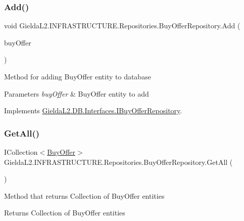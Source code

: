 \subsubsection{\texorpdfstring{Add()}{Add()}}
{\footnotesize\ttfamily void Gielda\+L2.\+I\+N\+F\+R\+A\+S\+T\+R\+U\+C\+T\+U\+R\+E.\+Repositories.\+Buy\+Offer\+Repository.\+Add (\begin{DoxyParamCaption}\item[{\mbox{\hyperlink{class_gielda_l2_1_1_d_b_1_1_entities_1_1_buy_offer}{Buy\+Offer}}}]{buy\+Offer }\end{DoxyParamCaption})}



Method for adding Buy\+Offer entity to database 


\begin{DoxyParams}{Parameters}
{\em buy\+Offer} & Buy\+Offer entity to add\\
\hline
\end{DoxyParams}


Implements \mbox{\hyperlink{interface_gielda_l2_1_1_d_b_1_1_interfaces_1_1_i_buy_offer_repository_aae66f2818cb5476f701c68266e413d87}{Gielda\+L2.\+D\+B.\+Interfaces.\+I\+Buy\+Offer\+Repository}}.

\mbox{\label{class_gielda_l2_1_1_i_n_f_r_a_s_t_r_u_c_t_u_r_e_1_1_repositories_1_1_buy_offer_repository_ab0ce549916d7e0cd138454a9768ed7c5}} 
\subsubsection{\texorpdfstring{GetAll()}{GetAll()}}
{\footnotesize\ttfamily I\+Collection$<$\mbox{\hyperlink{class_gielda_l2_1_1_d_b_1_1_entities_1_1_buy_offer}{Buy\+Offer}}$>$ Gielda\+L2.\+I\+N\+F\+R\+A\+S\+T\+R\+U\+C\+T\+U\+R\+E.\+Repositories.\+Buy\+Offer\+Repository.\+Get\+All (\begin{DoxyParamCaption}{ }\end{DoxyParamCaption})}



Method that returns Collection of Buy\+Offer entities 

\begin{DoxyReturn}{Returns}
Collection of Buy\+Offer entities
\end{DoxyReturn}



